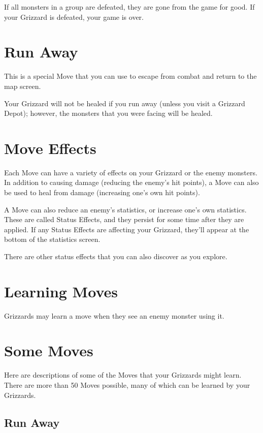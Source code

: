 \documentclass[12pt,twoside,openright,book]{memoir}
\begin{document}
\begin{description}
If all  monsters in a  group are defeated, they  are gone from  the game
for good. If your Grizzard is defeated, your game is over.

\section{Run Away}

This is a special Move that you can use to escape from combat and return
to the map screen.

Your  Grizzard will  not be  healed if  you run  away (unless  you visit
a  Grizzard Depot);  however, the  monsters  that you  were facing  will
be healed.

\section{Move Effects}

Each  Move  can have  a  variety  of effects  on  your  Grizzard or  the
enemy monsters. In addition to  causing damage (reducing the enemy's hit
points), a Move  can also be used to heal  from damage (increasing one's
own hit points).

A Move  can also  reduce an  enemy's statistics,  or increase  one's own
statistics. These are  called Status Effects, and they  persist for some
time after  they are applied. If  any Status Effects are  affecting your
Grizzard, they'll appear at the bottom of the statistics screen.

There  are  other   status  effects  that  you  can   also  discover  as
you explore.

\section{Learning Moves}

Grizzards may learn a move when they see an enemy monster using it.

\section{Some Moves}

Here  are  descriptions  of  some  of  the  Moves  that  your  Grizzards
might learn. There are more than 50 Moves possible, many of which can be
learned by your Grizzards.

\subsection{Run Away}


\end{description}
\end{document}
